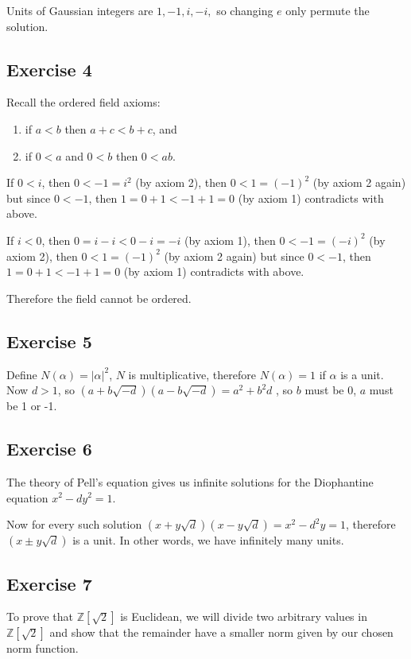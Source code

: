 \documentclass{article}
\begin{document}
Units of Gaussian integers are $ 1, -1, i, -i, $ so changing $ e $ only permute the solution.

\subsection{Exercise 4}
Recall the ordered field axioms:

\begin{enumerate}
    \item if $ a < b $ then $ a + c < b + c $, and 
    \item if $ 0 < a $ and $ 0 < b $ then $ 0 < ab $.
\end{enumerate}

If $ 0 < i $, then $ 0 < -1 = i^2 $ (by axiom 2), then $ 0 < 1 = (-1)^2 $ (by axiom 2 again)
but since $ 0 < -1 $, then $ 1 = 0 + 1 < -1 + 1 = 0 $ (by axiom 1) contradicts with above.

If $ i < 0 $, then $ 0 = i - i < 0 - i = -i $ (by axiom 1), then $ 0 < -1 = (-i)^2 $ (by axiom 2), then $ 0 < 1 = (-1)^2 $ (by axiom 2 again)
but since $ 0 < -1 $, then $ 1 = 0 + 1 < -1 + 1 = 0 $ (by axiom 1) contradicts with above.

Therefore the field cannot be ordered.

\subsection{Exercise 5}

Define $ N(\alpha) = |\alpha|^2 $, $ N $ is multiplicative, therefore $ N(\alpha) = 1 $ if $ \alpha $ is a unit. Now $ d > 1 $, so $ (a + b\sqrt{-d})(a - b\sqrt{-d}) = a^2 + b^2d $ , so $ b $ must be 0, $ a $ must be 1 or -1.

\subsection{Exercise 6}

The theory of Pell's equation gives us infinite solutions for the Diophantine equation $ x^2 - dy^2 = 1 $.

Now for every such solution $ (x + y \sqrt{d})(x - y \sqrt{d}) = x^2 - d^2y = 1 $, therefore $ (x \pm y \sqrt{d}) $ is a unit. In other words, we have infinitely many units.

\subsection{Exercise 7}
To prove that $ \mathbb{Z}[\sqrt{2}] $ is Euclidean, we will divide two arbitrary values in $ \mathbb{Z}[\sqrt{2}] $ and show that the remainder have a smaller norm given by our chosen norm function. 
\end{document}
